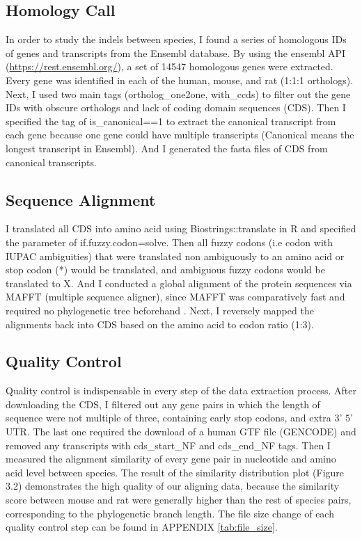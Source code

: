 \subsection{Homology Call}
In order to study the indels between species, I found a series of homologous IDs of genes and transcripts from the Ensembl database. By using the ensembl API (\href{https://rest.ensembl.org/}{https://rest.ensembl.org/}), a set of 14547 homologous genes were extracted. Every gene was identified in each of the human, mouse, and rat (1:1:1 orthologs). Next, I used two main tags (ortholog\_one2one, with\_ccds) to filter out the gene IDs with obscure orthologs and lack of coding domain sequences (CDS). Then I specified the tag of is\_canonical==1 to extract the canonical transcript from each gene because one gene could have multiple transcripts (Canonical means the longest transcript in Ensembl). And I generated the fasta files of CDS from canonical transcripts. 

\subsection{Sequence Alignment}
I translated all CDS into amino acid using Biostrings::translate in R and specified the parameter of if.fuzzy.codon=solve. Then all fuzzy codons (i.e codon with IUPAC ambiguities) that were translated non ambiguously to an amino acid or stop codon (*) would be translated, and ambiguous fuzzy codons would be translated to X. And I conducted a global alignment of the protein sequences via MAFFT (multiple sequence aligner), since MAFFT was comparatively fast and required no phylogenetic tree beforehand \parencite{katoh2005mafft}. Next, I reversely mapped the alignments back into CDS based on the amino acid to codon ratio (1:3).

\subsection{Quality Control}
Quality control is indispensable in every step of the data extraction process. After downloading the CDS, I filtered out any gene pairs in which the length of sequence were not multiple of three, containing early stop codons, and extra 3' 5' UTR. The last one required the download of a human GTF file (GENCODE) and removed any transcripts with cds\_start\_NF and  cds\_end\_NF tags. Then I measured the alignment similarity of every gene pair in nucleotide and amino acid level between species. The result of the similarity distribution plot (Figure 3.2) demonstrates the high quality of our aligning data, because the similarity score between mouse and rat were generally higher than the rest of species pairs, corresponding to the phylogenetic branch length. The file size change of each quality control step can be found in APPENDIX \ref{tab:file_size}. 

